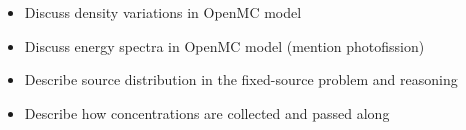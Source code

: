 \begin{itemize}
    \item Discuss density variations in OpenMC model
    \item Discuss energy spectra in OpenMC model (mention photofission)
    \item Describe source distribution in the fixed-source problem and reasoning
    \item Describe how concentrations are collected and passed along
\end{itemize}

